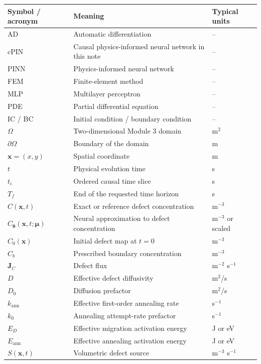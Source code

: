 \documentclass[11pt]{article}
\newcommand{\thetav}{\bm{\theta}}
\newcommand{\muv}{\bm{\mu}}
\newcommand{\xv}{\bm{x}}
\newcommand{\Cnet}{C_{\thetav}}
\newcommand{\Om}{\Omega}
\begin{document}
\renewcommand{\arraystretch}{1.22}
\begin{longtable}{p{} p{} p{}}
\toprule
\textbf{Symbol / acronym} & \textbf{Meaning} & \textbf{Typical units} \\
\midrule
\endhead
AD & Automatic differentiation & -- \\
cPIN & Causal physics-informed neural network in this note & -- \\
PINN & Physics-informed neural network & -- \\
FEM & Finite-element method & -- \\
MLP & Multilayer perceptron & -- \\
PDE & Partial differential equation & -- \\
IC / BC & Initial condition / boundary condition & -- \\
$\Om$ & Two-dimensional Module 3 domain & m$^2$ \\
$\partial\Om$ & Boundary of the domain & m \\
$\xv=(x,y)$ & Spatial coordinate & m \\
$t$ & Physical evolution time & s \\
$t_i$ & Ordered causal time slice & s \\
$T_f$ & End of the requested time horizon & s \\
$C(\xv,t)$ & Exact or reference defect concentration & m$^{-3}$ \\
$\Cnet(\xv,t;\muv)$ & Neural approximation to defect concentration & m$^{-3}$ or scaled \\
$C_0(\xv)$ & Initial defect map at $t=0$ & m$^{-3}$ \\
$C_b$ & Prescribed boundary concentration & m$^{-3}$ \\
$\mathbf{J}_C$ & Defect flux & m$^{-2}$ s$^{-1}$ \\
$D$ & Effective defect diffusivity & m$^2$/s \\
$D_0$ & Diffusion prefactor & m$^2$/s \\
$k_{\mathrm{ann}}$ & Effective first-order annealing rate & s$^{-1}$ \\
$k_0$ & Annealing attempt-rate prefactor & s$^{-1}$ \\
$E_D$ & Effective migration activation energy & J or eV \\
$E_{\mathrm{ann}}$ & Effective annealing activation energy & J or eV \\
$S(\xv,t)$ & Volumetric defect source & m$^{-3}$ s$^{-1}$ \\

\end{longtable}
\end{document}

